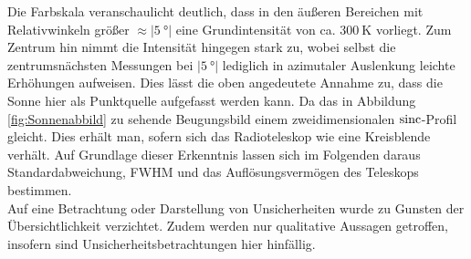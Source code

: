     Die Farbskala veranschaulicht deutlich, dass in den äußeren Bereichen mit Relativwinkeln größer $\approx \vert \SI{5}{\degree}\vert$ eine Grundintensität von ca. $\SI{300}{\kelvin}$ vorliegt.
    Zum Zentrum hin nimmt die Intensität hingegen stark zu,
    wobei selbst die zentrumsnächsten Messungen bei $\vert\SI{5}{\degree}\vert$ lediglich in azimutaler Auslenkung leichte Erhöhungen aufweisen.
    Dies lässt die oben angedeutete Annahme zu, dass die Sonne hier als Punktquelle aufgefasst werden kann. 
    Da das in Abbildung \ref{fig:Sonnenabbild} zu sehende Beugungsbild einem zweidimensionalen $\operatorname{sinc}$-Profil gleicht.
    Dies erhält man, sofern sich das Radioteleskop wie eine Kreisblende verhält. Auf Grundlage dieser Erkenntnis lassen sich im Folgenden daraus Standardabweichung, FWHM und das Auflösungsvermögen des Teleskops bestimmen.\\
    Auf eine Betrachtung oder Darstellung von Unsicherheiten wurde zu Gunsten der Übersichtlichkeit verzichtet. Zudem werden nur qualitative Aussagen getroffen, insofern sind Unsicherheitsbetrachtungen hier hinfällig.

